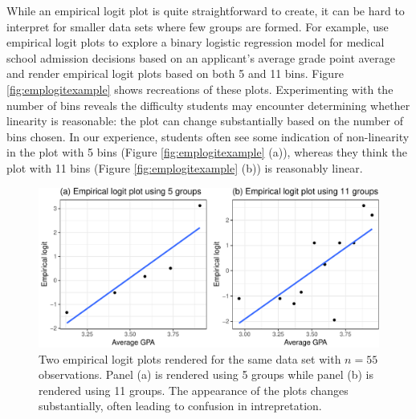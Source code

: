 \documentclass[12pt]{article}
\begin{document}
While an empirical logit plot is quite straightforward to create, it can
be hard to interpret for smaller data sets where few groups are formed.
For example, \citet{stat2} use empirical logit plots to explore a binary
logistic regression model for medical school admission decisions based
on an applicant's average grade point average and render empirical logit
plots based on both 5 and 11 bins. Figure \ref{fig:emplogitexample}
shows recreations of these plots. Experimenting with the number of bins
reveals the difficulty students may encounter determining whether
linearity is reasonable: the plot can change substantially based on the
number of bins chosen. In our experience, students often see some
indication of non-linearity in the plot with 5 bins (Figure
\ref{fig:emplogitexample} (a)), whereas they think the plot with 11 bins
(Figure \ref{fig:emplogitexample} (b)) is reasonably linear.

\begin{figure}

{\centering \includegraphics[width=0.85\linewidth]{vizinf-paper-blind_files/figure-latex/unnamed-chunk-7-1} 

}

\caption{\label{fig:emplogitexample} Two empirical logit plots rendered for the same data set with $n=55$ observations. Panel (a) is rendered using 5 groups while panel (b) is rendered using 11 groups. The appearance of the plots changes substantially, often leading to confusion in intrepretation.}\label{fig:unnamed-chunk-7}
\end{figure}
\end{document}
